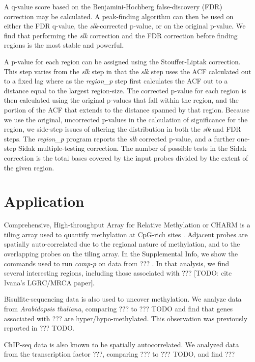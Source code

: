 \documentclass{bioinfo}
\begin{document}
\begin{methods}
A q-value score based on the Benjamini-Hochberg false-discovery (FDR) correction
 may be calculated. A peak-finding algorithm can then be used on either the FDR
q-value, the \textit{slk}-corrected p-value, or on the original p-value.
We find that performing the \textit{slk} correction and the FDR correction
before finding regions is the most stable and powerful.

A p-value for each region can be assigned using the Stouffer-Liptak correction.
This step varies from the \textit{slk} step in that the \textit{slk} step uses
the ACF calculated out to a fixed lag where as the \textit{region\_p} step first
calculates the ACF out to a distance equal to the largest region-size. The
corrected p-value for each region is then calculated using the original p-values that
fall within the region, and the portion of the ACF that extends to the distance
spanned by that region. Because we use the original, uncorrected p-values in the
calculation of significance for the region, we side-step issues of altering the
distribution in both the \textit{slk} and FDR steps. The \textit{region\_p}
program reports the \textit{slk} corrected p-value, and a further one-step
Sidak \citep{Sidak}
multiple-testing correction. The number of possible tests in the Sidak correction
is the total bases covered by the input probes divided by the extent of the
given region.

\section{Application}
Comprehensive, High-throughput Array for Relative Methylation or CHARM is a
tiling array used to quantify methylation at CpG-rich sites \citep{Irizarry}.
Adjacent probes are spatially auto-correlated due to the regional nature of
methylation, and to the overlapping probes on the tiling array. In the
Supplemental Info, we show the commands used to run \textit{comp-p} on data from
??? . In that analysis, we find several interesting regions, including those
associated with ??? [TODO: cite Ivana's LGRC/MRCA paper].

Bisulfite-sequencing data is also used to uncover methylation. We analyze
data from {\it Arabidopsis thaliana}, comparing ??? to ??? TODO and find
that genes associated with ??? are hyper/hypo-methylated. This observation
was previously reported in ??? TODO.

ChIP-seq data is also known to be spatially autocorrelated. We analyzed data
from the transcription factor ???, comparing ??? to ??? TODO, and find
???

\end{methods}
\end{document}
